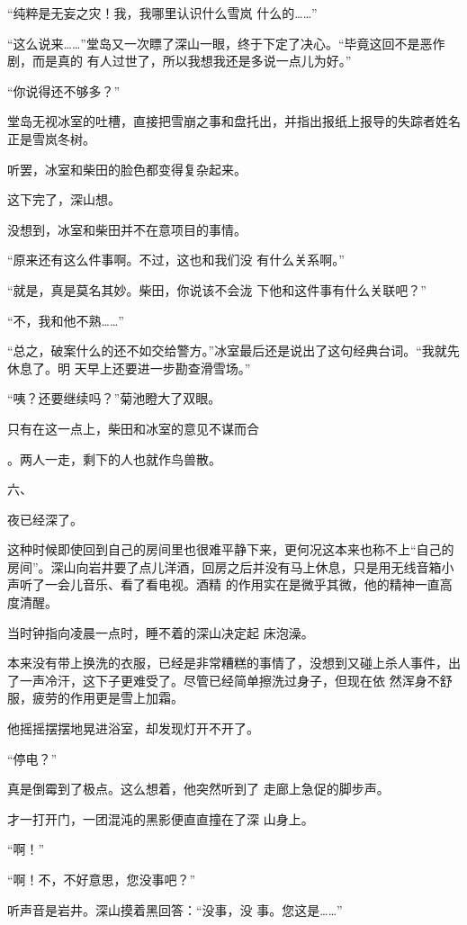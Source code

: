 \documentclass{article}
\begin{document}
“纯粹是无妄之灾！我，我哪里认识什么雪岚
什么的……” 

“这么说来……”堂岛又一次瞟了深山一眼，终于下定了决心。“毕竟这回不是恶作剧，而是真的
有人过世了，所以我想我还是多说一点儿为好。” 


“你说得还不够多？” 

堂岛无视冰室的吐槽，直接把雪崩之事和盘托出，并指出报纸上报导的失踪者姓名正是雪岚冬树。

\newpage
听罢，冰室和柴田的脸色都变得复杂起来。 


这下完了，深山想。 


没想到，冰室和柴田并不在意项目的事情。 

“原来还有这么件事啊。不过，这也和我们没
有什么关系啊。” 

“就是，真是莫名其妙。柴田，你说该不会泷
下他和这件事有什么关联吧？” 


“不，我和他不熟……” 

“总之，破案什么的还不如交给警方。”冰室最后还是说出了这句经典台词。“我就先休息了。明
天早上还要进一步勘查滑雪场。” 


“咦？还要继续吗？”菊池瞪大了双眼。 

只有在这一点上，柴田和冰室的意见不谋而合

\newpage
。两人一走，剩下的人也就作鸟兽散。 


六、 


夜已经深了。 

这种时候即使回到自己的房间里也很难平静下来，更何况这本来也称不上“自己的房间”。深山向岩井要了点儿洋酒，回房之后并没有马上休息，只是用无线音箱小声听了一会儿音乐、看了看电视。酒精
的作用实在是微乎其微，他的精神一直高度清醒。 

当时钟指向凌晨一点时，睡不着的深山决定起
床泡澡。 

本来没有带上换洗的衣服，已经是非常糟糕的事情了，没想到又碰上杀人事件，出了一声冷汗，这下子更难受了。尽管已经简单擦洗过身子，但现在依
然浑身不舒服，疲劳的作用更是雪上加霜。 

他摇摇摆摆地晃进浴室，却发现灯开不开了。

\newpage


“停电？” 

真是倒霉到了极点。这么想着，他突然听到了
走廊上急促的脚步声。 

才一打开门，一团混沌的黑影便直直撞在了深
山身上。 


“啊！” 


“啊！不，不好意思，您没事吧？” 

听声音是岩井。深山摸着黑回答：“没事，没
事。您这是……” 
\end{document}
